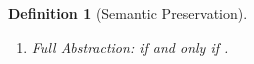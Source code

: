 \documentclass[preprint,11pt]{elsarticle}
\newtheorem{definition}{Definition}[section]
\begin{document}
{{\begin{definition}[Semantic Preservation]
\begin{enumerate}[1.]
\begin{enumerate}
			\item	Soundness:   
				If  $\wtytraargi{\mapt{\Gamma}}{}{\mapt{\Delta}}{\map{P}}{\mapt{\Delta'}}{Q}{2}{2}$
				then  $\exists P', \Delta''$ s.t.  \\
				(i)~$\stytraargi{\Gamma}{\tau}{\Delta}{P}{\Delta''}{P'}{1}{1}$
				and 
				(ii)~
${\mapt{\Gamma}};{\mapt{\Delta''}}\proves_2 {\map{P'}}{\,\wb_2\,}
{\mapt{\Delta'}}\proves_2 {Q}$.

		\end{enumerate}
		
		\item \emph{Full Abstraction:} 
		if and only if 
		.
		
	\end{enumerate}
\end{definition}


}}
\end{document}
